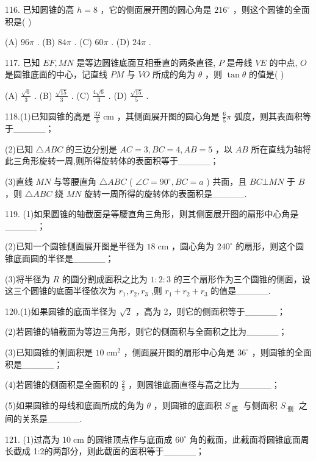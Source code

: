 \documentclass[10pt]{article}
\begin{document}
116. 已知圆锥的高 \(h = 8\) ，它的侧面展开图的圆心角是 \({216}^{ \circ  }\) ，则这个圆锥的全面积是( )

(A) \({96\pi }\) . (B) \({84\pi }\) . (C) \({60\pi }\) . (D) \({24\pi }\) .

117. 已知 \({EF},{MN}\) 是等边圆锥底面互相垂直的两条直径, \(P\) 是母线 \({VE}\) 的中点, \(O\) 是圆锥底面的中心，记直线 \({PM}\) 与 \({VO}\) 所成的角为 \(\theta\) ，则 \(\tan \theta\) 的值是( )

(A) \(\frac{\sqrt{6}}{3}\) . (B) \(\frac{\sqrt{15}}{3}\) . (C) \(\frac{4\sqrt{6}}{3}\) . (D) \(\frac{\sqrt{15}}{5}\) .

118.(1)已知圆锥的高是 \(\frac{32}{3}\mathrm{\;{cm}}\) ，其侧面展开图的圆心角是 \(\frac{6}{5}\pi\) 弧度，则其表面积等于\_\_\_\_\_；

(2)已知 \(\bigtriangleup  {ABC}\) 的三边分别是 \({AC} = 3,{BC} = 4,{AB} = 5\) ，以 \({AB}\) 所在直线为轴将此三角形旋转一周,则所得旋转体的表面积等于\_\_\_\_\_；

(3)直线 \({MN}\) 与等腰直角 \(\bigtriangleup  {ABC}\) ( \(\angle C = {90}^{ \circ  },{BC} = a\) ) 共面，且 \({BC}\bot {MN}\) 于 \(B\) ，则 \(\bigtriangleup  {ABC}\) 绕 \({MN}\) 旋转一周所得的旋转体的表面积是\_\_\_\_\_.

119. (1)如果圆锥的轴截面是等腰直角三角形，则其侧面展开图的扇形中心角是\_\_\_\_\_；

(2)已知一个圆锥侧面展开图是半径为 \({18}\mathrm{\;{cm}}\) ，圆心角为 \({240}^{ \circ  }\) 的扇形，则这个圆锥底面圆的半径是\_\_\_\_\_；

(3)将半径为 \(R\) 的圆分割成面积之比为 \(1 : 2 : 3\) 的三个扇形作为三个圆锥的侧面，设这三个圆锥的底面半径依次为 \({r}_{1},{r}_{2},{r}_{3}\) ,则 \({r}_{1} + {r}_{2} + {r}_{3}\) 的值是\_\_\_\_\_.

120.(1)如果圆锥的底面半径为 \(\sqrt{2}\) ，高为 2，则它的侧面积等于\_\_\_\_\_；

(2)若圆锥的轴截面为等边三角形，则它的侧面积与全面积之比为\_\_\_\_\_；

(3)已知圆锥的侧面积是 \({10}{\mathrm{\;{cm}}}^{2}\) ，侧面展开图的扇形中心角是 \({36}^{ \circ  }\) ，则圆锥的全面积是\_\_\_\_\_；

(4)若圆锥的侧面积是全面积的 \(\frac{2}{3}\) ，则圆锥底面直径与高之比为\_\_\_\_\_；

(5)如果圆锥的母线和底面所成的角为 \(\theta\) ，则圆锥的底面积 \({S}_{\text{ 底 }}\) 与侧面积 \({S}_{\text{ 侧 }}\) 之间的关系是\_\_\_\_\_.

121. (1)过高为 \({10}\mathrm{\;{cm}}\) 的圆锥顶点作与底面成 \({60}^{ \circ  }\) 角的截面，此截面将圆锥底面周长截成 1:2的两部分，则此截面的面积等于\_\_\_\_\_；
\end{document}

